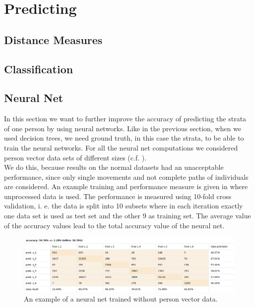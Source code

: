 \documentclass[runningheads]{llncs}
\begin{document}
	\section{Predicting}
	
	\subsection{Distance Measures} \label{subsec: distance measures}
	
	\subsection{Classification} \label{subsec: classification}
	

	
	\subsection{Neural Net} \label{subsec: neural net}
	In this section we want to further improve the accuracy of predicting the strata of one person by using neural networks. Like in the previous section, when we used decision trees, we need ground truth, in this case the strata, to be able to train the neural networks. For all the neural net computations we considered person vector data sets of different sizes (c.f. ).\\
	
	We do this, because results on the normal datasets had an unacceptable performance, since only single movements and not complete paths of individuals are considered. An example training and performance measure is given in  where unprocessed data is used. The performance is measured using 10-fold cross validation, i. e. the data is split into 10 subsets where in each iteration exactly one data set is used as test set and the other 9 as training set. The average value of the accuracy values lead
	to the total accuracy value of the neural net.
	\begin{figure}[H]
		\centering
		\includegraphics[scale = 0.4]{src/pic/NN_without_vector.png}
		\caption{An example of a neural net trained without person vector data.}
		\label{fig: NN without vector}
	\end{figure}
	
\end{document}
